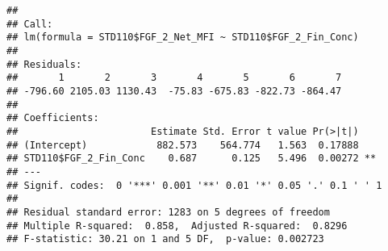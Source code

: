 \documentclass[]{article}
\newenvironment{Shaded}{\begin{snugshade}}{\end{snugshade}}
\newcommand{\CommentTok}[1]{\textcolor[rgb]{0.56,0.35,0.01}{\textit{#1}}}
\newcommand{\DecValTok}[1]{\textcolor[rgb]{0.00,0.00,0.81}{#1}}
\newcommand{\KeywordTok}[1]{\textcolor[rgb]{0.13,0.29,0.53}{\textbf{#1}}}
\newcommand{\NormalTok}[1]{#1}
\newcommand{\OperatorTok}[1]{\textcolor[rgb]{0.81,0.36,0.00}{\textbf{#1}}}
\newcommand{\StringTok}[1]{\textcolor[rgb]{0.31,0.60,0.02}{#1}}
\begin{document}
\begin{Shaded}
\end{Shaded}

\begin{verbatim}
## 
## Call:
## lm(formula = STD110$FGF_2_Net_MFI ~ STD110$FGF_2_Fin_Conc)
## 
## Residuals:
##       1       2       3       4       5       6       7 
## -796.60 2105.03 1130.43  -75.83 -675.83 -822.73 -864.47 
## 
## Coefficients:
##                       Estimate Std. Error t value Pr(>|t|)   
## (Intercept)            882.573    564.774   1.563  0.17888   
## STD110$FGF_2_Fin_Conc    0.687      0.125   5.496  0.00272 **
## ---
## Signif. codes:  0 '***' 0.001 '**' 0.01 '*' 0.05 '.' 0.1 ' ' 1
## 
## Residual standard error: 1283 on 5 degrees of freedom
## Multiple R-squared:  0.858,  Adjusted R-squared:  0.8296 
## F-statistic: 30.21 on 1 and 5 DF,  p-value: 0.002723
\end{verbatim}
\end{document}
